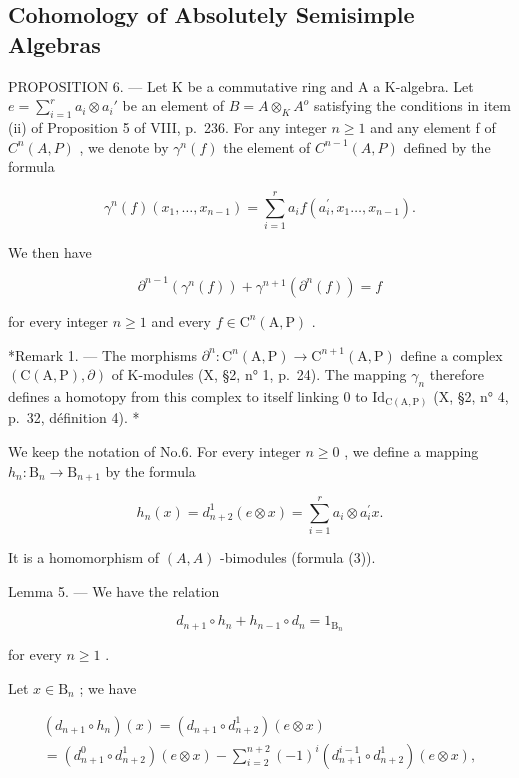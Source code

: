 \subsection{Cohomology of Absolutely Semisimple Algebras}

PROPOSITION 6. --- Let K be a commutative ring and A a K-algebra. Let \(e = \sum_{i=1}^{r} a_i \otimes a_i'\) be an element of \(B = A \otimes_K A^o\) satisfying the conditions in item (ii) of Proposition 5 of VIII, p.~236. For any integer \(n \geqslant 1\) and any element f of \(C^n(A, P)\) , we denote by \(\gamma^n(f)\) the element of \(C^{n-1}(A, P)\) defined by the formula

\[
\gamma^ {n} (f) \left(x _ {1}, \dots , x _ {n - 1}\right) = \sum_ {i = 1} ^ {r} a _ {i} f \left(a _ {i} ^ {\prime}, x _ {1} \dots , x _ {n - 1}\right).\tag{15}
\]

We then have

\[
\partial^ {n - 1} (\gamma^ {n} (f)) + \gamma^ {n + 1} (\partial^ {n} (f)) = f\tag{16}
\]

for every integer \(n \geqslant 1\) and every \(f \in \mathrm{C}^n(\mathrm{A},\mathrm{P})\) .

*Remark 1. --- The morphisms \(\partial^n: \mathrm{C}^n(\mathrm{A},\mathrm{P}) \to \mathrm{C}^{n+1}(\mathrm{A},\mathrm{P})\) define a complex \((\mathrm{C}(\mathrm{A},\mathrm{P}),\partial)\) of K-modules (X, §2, n° 1, p.~24). The mapping \(\gamma_n\) therefore defines a homotopy from this complex to itself linking 0 to \(\mathrm{Id}_{\mathrm{C}(\mathrm{A},\mathrm{P})}\) (X, §2, n° 4, p.~32, définition 4). *

We keep the notation of No.6. For every integer \(n \geqslant 0\) , we define a mapping \(h_n: \mathrm{B}_n \to \mathrm{B}_{n+1}\) by the formula

\[
h _ {n} (x) = d _ {n + 2} ^ {1} (e \otimes x) = \sum_ {i = 1} ^ {r} a _ {i} \otimes a _ {i} ^ {\prime} x.
\]

It is a homomorphism of \((A, A)\) -bimodules (formula (3)).

Lemma 5. --- We have the relation

\[
d _ {n + 1} \circ h _ {n} + h _ {n - 1} \circ d _ {n} = 1 _ {\mathrm{B} _ {n}}\tag{17}
\]

for every \(n \geqslant 1\) .

Let \(x\in \mathrm{B}_n\) ; we have

\[
\begin{array}{c} (d _ {n + 1} \circ h _ {n}) (x) = (d _ {n + 1} \circ d _ {n + 2} ^ {1}) (e \otimes x) \\ = (d _ {n + 1} ^ {0} \circ d _ {n + 2} ^ {1}) (e \otimes x) - \sum_ {i = 2} ^ {n + 2} (- 1) ^ {i} (d _ {n + 1} ^ {i - 1} \circ d _ {n + 2} ^ {1}) (e \otimes x), \end{array}
\]


